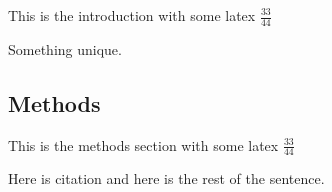 \documentclass{optica-article}
\begin{document}
This is the introduction with some latex \(\frac{33}{44}\)

Something unique.

\hypertarget{methods}{%
\subsection{Methods}\label{methods}}

This is the methods section with some latex \(\frac{33}{44}\)

Here is citation \cite{Dolinar2011Photon} and here is the rest of the sentence.


\end{document}
